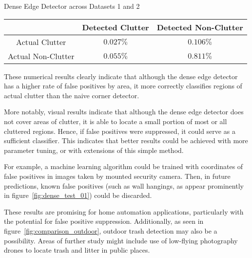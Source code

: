 \documentclass[11pt]{article}
\begin{document}
\begin{center}
    {\large Dense Edge Detector across Datasets 1 and 2} \\[1em]
\begin{tabular}{c|cc}
    & Detected Clutter & Detected Non-Clutter \\
    \hline
    Actual Clutter     & $0.027\%$ & $0.106\%$ \\
    Actual Non-Clutter & $0.055\%$ & $0.811\%$
\end{tabular}
\end{center}

These numerical results clearly indicate that although the dense edge detector
has a higher rate of false positives by area, it more correctly classifies regions of
actual clutter than the naive corner detector. 

More notably, visual results indicate that although the dense edge detector does
not cover areas of clutter, it is able to locate a small portion of most or all
cluttered regions. Hence, if false positives were suppressed, it could serve as
a sufficient classifier. This indicates that better results could be achieved
with more parameter tuning, or with extensions of this simple method.

For example, a machine learning algorithm could be trained with coordinates of
false positives in images taken by mounted security camera. Then, in future
predictions, known false positives (such as wall hangings, as appear prominently
in figure~\ref{fig:dense_test_01}) could be discarded.

These results are promising for home automation applications, particularly with
the potential for false positive suppression. Additionally, as seen in
figure~\ref{fig:comparison_outdoor}, outdoor trash detection may also be a
possibility. Areas of further study might include use of low-flying photography
drones to locate trash and litter in public places.
\end{document}
